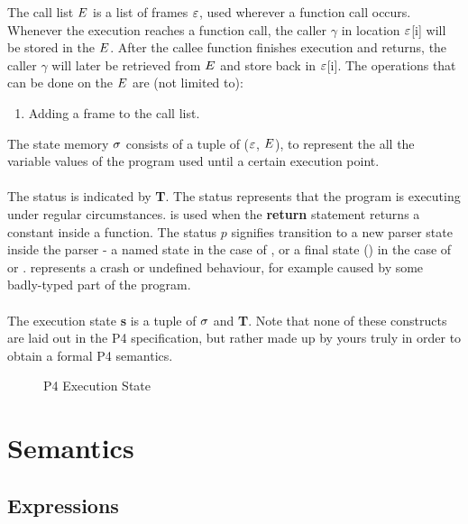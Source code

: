 \documentclass[UTF8]{article}
\begin{document}
The call list $E$ is a list of frames $\varepsilon$, used wherever a function call occurs. Whenever the execution reaches a function call, the caller $\gamma$ in location $\varepsilon$[i] will be stored in the $E$. After the callee function finishes execution and returns, the caller $\gamma$ will later be retrieved from $E$ and store back in $\varepsilon$[i]. The operations that can be done on the $E$ are (not limited to): 
\begin{enumerate}
\item Adding a frame to the call list.
\end{enumerate}

The state memory $\sigma{}$ consists of a tuple of ($\varepsilon$, $E$), to represent the all the variable values of the program used until a certain execution point.
\\~\\
The status is indicated by \textbf{T}. The status \running{} represents that the program is executing under regular circumstances. \returnst{} is used when the \textbf{return} statement returns a constant inside a function. The status $p$ signifies transition to a new parser state inside the parser - a named state in the case of \trans{\str{}}, or a final state (\pfin{}) in the case of \accept{} or \reject{}. \sterr{} represents a crash or undefined behaviour, for example caused by some badly-typed part of the program. 
\\~\\
The execution state \textbf{s} is a tuple of $\sigma{}$ and \textbf{T}. Note that none of these constructs are laid out in the P4 specification, but rather made up by yours truly in order to obtain a formal P4 semantics.
\begin{figure}[h!]
\centering\ottgrammartabular{
\ottstatus\ottinterrule
\ottstate\ottafterlastrule
}
\caption{P4 Execution State}
\label{fig:status}
\end{figure}

\section{Semantics}
\subsection{Expressions}
\end{document}
